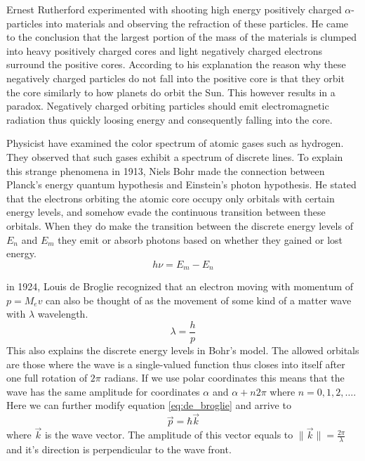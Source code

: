 Ernest Rutherford experimented with shooting high energy positively charged $\alpha$-particles into materials and observing the refraction of these particles.
He came to the conclusion that the largest portion of the mass of the materials is clumped into heavy positively charged cores and light negatively charged electrons surround the positive cores.
According to his explanation the reason why these negatively charged particles do not fall into the positive core is that they orbit the core similarly to how planets do orbit the Sun.
This however results in a paradox.
Negatively charged orbiting particles should emit electromagnetic radiation thus quickly loosing energy and consequently falling into the core.

Physicist have examined the color spectrum of atomic gases such as hydrogen.
They observed that such gases exhibit a spectrum of discrete lines.
To explain this strange phenomena in 1913, Niels Bohr made the connection between Planck's energy quantum hypothesis and Einstein's photon hypothesis.
He stated that the electrons orbiting the atomic core occupy only orbitals with certain energy levels, and somehow evade the continuous transition between these orbitals.
When they do make the transition between the discrete energy levels of $E_n$ and $E_m$ they emit or absorb photons based on whether they gained or lost energy.
\begin{equation}
	h\nu = E_m - E_n
\end{equation}

in 1924, Louis de Broglie recognized that an electron moving with momentum of $p=M_ev$ can also be thought of as the movement of some kind of a matter wave with $\lambda$ wavelength.
\begin{equation}
	\label{eq:de_broglie}
	\lambda = \frac{h}{p}
\end{equation}
This also explains the discrete energy levels in Bohr's model.
The allowed orbitals are those where the wave is a single-valued function thus closes into itself after one full rotation of $2\pi$ radians.
If we use polar coordinates this means that the wave has the same amplitude for coordinates $\alpha$ and $\alpha + n2\pi$ where $n = 0, 1, 2, \dots$.
Here we can further modify equation \ref{eq:de_broglie} and arrive to
\begin{equation}
	\vec{p} = \hbar \vec{k}
\end{equation}
where $\vec{k}$ is the wave vector. The amplitude of this vector equals to $\|\vec{k}\|= \frac{2\pi}{\lambda}$ and it's direction is perpendicular to the wave front.


